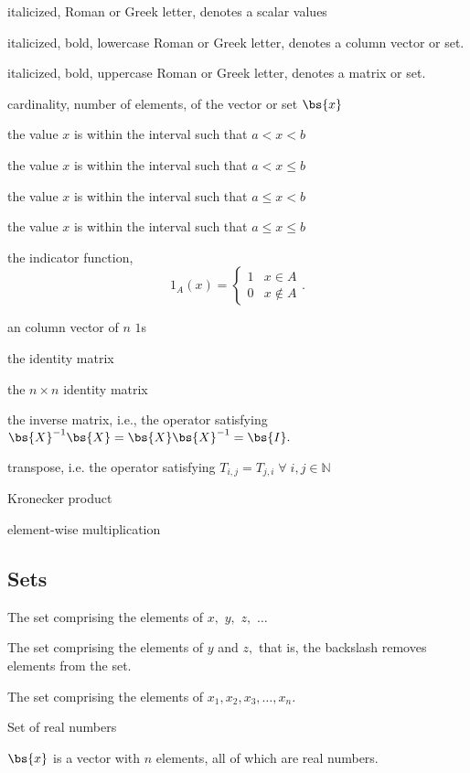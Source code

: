 \begin{description}[leftmargin=!, labelwidth=0.7in]
  \item[$x$]             italicized, Roman or Greek letter, denotes a scalar values 
  \item[$\bs{x}$]        italicized, bold, lowercase Roman or Greek letter, denotes a column vector or set.
  \item[$\bs{X}$]        italicized, bold, uppercase Roman or Greek letter, denotes a matrix or set.
  \item[$\card{\bs{x}}$] cardinality, number of elements, of the vector or set $\bs{x}$ 
  \item[$x \in (a, b)$]  the value $x$ is within the interval such that $a < x < b$
  \item[{$x \in (a, b]$}]  the value $x$ is within the interval such that $a < x \leq b$
  \item[$x \in [a, b)$]  the value $x$ is within the interval such that $a \leq x < b$
  \item[{$x \in [a, b]$}]  the value $x$ is within the interval such that $a \leq x \leq b$ 
  \item[$1_{A}\left(x\right)$] the indicator function,\[1_{A}\left(x \right) = \begin{cases} 1 & x \in A \\ 0 & x \notin A \end{cases}.\] 
  \item[$\bs{1}_n$] an column vector of $n$ $1$s
  \item[$\bs{I}$] the identity matrix
  \item[$\bs{I}_n$] the $n \times n$ identity matrix
  \item[$\bs{X}^{-1}$] the inverse matrix, i.e., the operator satisfying $\bs{X}^{-1} \bs{X} = \bs{X} \bs{X}^{-1} = \bs{I}.$
  \item[$\bs{X}^{T}$] transpose, i.e. the operator satisfying $T_{i,j} = T_{j, i} \; \forall \; i,j \in \mathbb{N}$
  \item[$\otimes$] Kronecker product
  \item[$\odot$] element-wise multiplication
\end{description}

\subsection{Sets}

\begin{description}[leftmargin=!, labelwidth=0.8in]
  \item[$\{x, y, z, \ldots\}$]  The set comprising the elements of $x,$ $y,$ $z,$ $\ldots$ 
  \item[$\{x, y, z\} \backslash x$]  The set comprising the elements of $y$ and $z,$ that is, the backslash removes elements from the set.
  \item[$\left\{x_i\right\}_{i = 1}^{n}$]  The set comprising the elements of $x_1, x_2, x_3, \ldots, x_n.$ 
  \item[$\mathbb{R}$] Set of real numbers 
  \item[$\bs{x} \in \mathbb{R}^n$] $\bs{x}$ is a vector with $n$ elements, all of which are real numbers.
\end{description}

